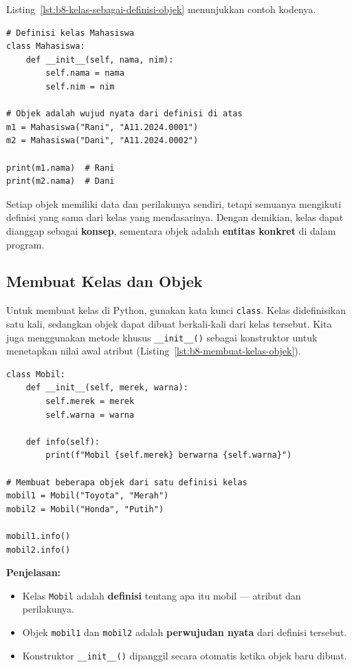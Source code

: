 Listing~\ref{lst:b8-kelas-sebagai-definisi-objek} menunjukkan contoh kodenya.

\begin{lstlisting}[style=PythonStyle, caption={Kelas sebagai Definisi Objek}, label={lst:b8-kelas-sebagai-definisi-objek}]
# Definisi kelas Mahasiswa
class Mahasiswa:
    def __init__(self, nama, nim):
        self.nama = nama
        self.nim = nim

# Objek adalah wujud nyata dari definisi di atas
m1 = Mahasiswa("Rani", "A11.2024.0001")
m2 = Mahasiswa("Dani", "A11.2024.0002")

print(m1.nama)  # Rani
print(m2.nama)  # Dani
\end{lstlisting}

Setiap objek memiliki data dan perilakunya sendiri, tetapi semuanya mengikuti definisi yang sama dari kelas yang mendasarinya.  
Dengan demikian, kelas dapat dianggap sebagai \textbf{konsep}, sementara objek adalah \textbf{entitas konkret} di dalam program.

\subsection{Membuat Kelas dan Objek}
Untuk membuat kelas di Python, gunakan kata kunci \texttt{class}. Kelas didefinisikan satu kali, sedangkan objek dapat dibuat berkali-kali dari kelas tersebut.  
Kita juga menggunakan metode khusus \texttt{__init__()} sebagai konstruktor untuk menetapkan nilai awal atribut (Listing~\ref{lst:b8-membuat-kelas-objek}).

\begin{lstlisting}[style=PythonStyle, caption={Membuat Kelas dan Objek}, label={lst:b8-membuat-kelas-objek}]
class Mobil:
    def __init__(self, merek, warna):
        self.merek = merek
        self.warna = warna

    def info(self):
        print(f"Mobil {self.merek} berwarna {self.warna}")

# Membuat beberapa objek dari satu definisi kelas
mobil1 = Mobil("Toyota", "Merah")
mobil2 = Mobil("Honda", "Putih")

mobil1.info()
mobil2.info()
\end{lstlisting}

\noindent\textbf{Penjelasan:}
\begin{itemize}
    \item Kelas \texttt{Mobil} adalah \textbf{definisi} tentang apa itu mobil — atribut dan perilakunya.
    \item Objek \texttt{mobil1} dan \texttt{mobil2} adalah \textbf{perwujudan nyata} dari definisi tersebut.
    \item Konstruktor \texttt{\_\_init\_\_()} dipanggil secara otomatis ketika objek baru dibuat.
\end{itemize}

